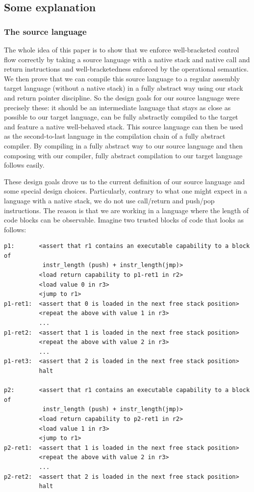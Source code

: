 \documentclass[a4paper]{article}
\begin{document}
\subsection{Some explanation}
\subsubsection{The source language}
The whole idea of this paper is to show that we enforce well-bracketed control flow correctly by taking a source language with a native stack and native call and return instructions and well-bracketedness enforced by the operational semantics.
We then prove that we can compile this source language to a regular assembly target language (without a native stack) in a fully abstract way using our stack and return pointer discipline.
So the design goals for our source language were precisely these: it should be an intermediate language that stays as close as possible to our target language, can be fully abstractly compiled to the target and feature a native well-behaved stack.
This source language can then be used as the second-to-last language in the compilation chain of a fully abstract compiler.
By compiling in a fully abstract way to our source language and then composing with our compiler, fully abstract compilation to our target language follows easily.

These design goals drove us to the current definition of our source language and some special design choices.
Particularly, contrary to what one might expect in a language with a native stack, we do not use call/return and push/pop instructions.
The reason is that we are working in a language where the length of code blocks can be observable.
Imagine two trusted blocks of code that looks as follows:
\begin{lstlisting}[basicstyle=\sourcecolor{}\ttfamily] 
p1:       <assert that r1 contains an executable capability to a block of 
           instr_length (push) + instr_length(jmp)> 
          <load return capability to p1-ret1 in r2>
          <load value 0 in r3>
          <jump to r1>
p1-ret1:  <assert that 0 is loaded in the next free stack position>
          <repeat the above with value 1 in r3>
          ...
p1-ret2:  <assert that 1 is loaded in the next free stack position>
          <repeat the above with value 2 in r3>
          ...
p1-ret3:  <assert that 2 is loaded in the next free stack position>
          halt

p2:       <assert that r1 contains an executable capability to a block of 
           instr_length (push) + instr_length(jmp)>
          <load return capability to p2-ret1 in r2>
          <load value 1 in r3>
          <jump to r1>
p2-ret1:  <assert that 1 is loaded in the next free stack position>
          <repeat the above with value 2 in r3>
          ...
p2-ret2:  <assert that 2 is loaded in the next free stack position>
          halt
\end{lstlisting}
\end{document}
